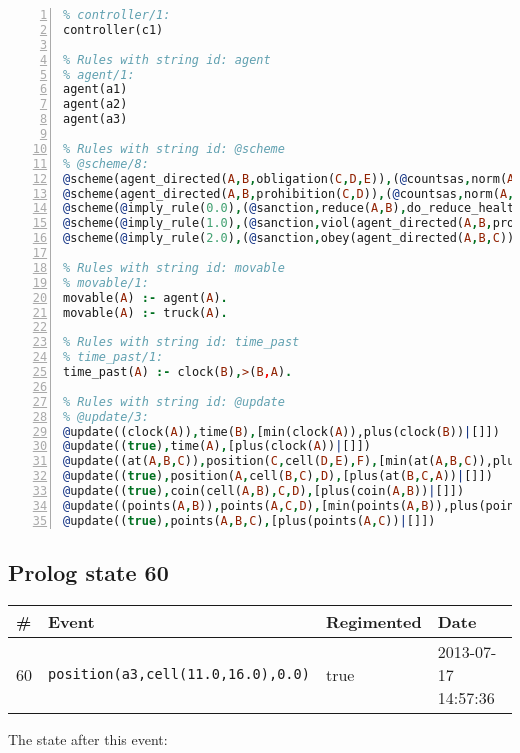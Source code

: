 \documentclass[11pt]{article}\usepackage[utf8]{inputenc}\usepackage{geometry}
\begin{document}
\begin{lstlisting}[language=Prolog, numbers=left]
% Rules with string id: controller
% controller/1:
controller(c1)

% Rules with string id: agent
% agent/1:
agent(a1)
agent(a2)
agent(a3)

% Rules with string id: @scheme
% @scheme/8:
@scheme(agent_directed(A,B,obligation(C,D,E)),(@countsas,norm(A,B,F,obligation(C,D,E)),F),false,(listTrue(C)),(time_past(D)),false,[plus(viol(agent_directed(A,B,obligation(C,D,E))))|[]],[plus(obey(agent_directed(A,B,obligation(C,D,E))))|[]])
@scheme(agent_directed(A,B,prohibition(C,D)),(@countsas,norm(A,B,E,prohibition(C,D)),E),(listTrue(C)),false,(false),false,[plus(viol(agent_directed(A,B,prohibition(C,D))))|[]],[plus(obey(agent_directed(A,B,prohibition(C,D))))|[]])
@scheme(@imply_rule(0.0),(@sanction,reduce(A,B),do_reduce_health(A,B),notifyAgent(A,changed(status))),true,false,false,false,[min(reduce(A,B))|[]],[])
@scheme(@imply_rule(1.0),(@sanction,viol(agent_directed(A,B,prohibition(C,D))),do_sanction(D)),true,false,false,false,[min(viol(agent_directed(A,B,prohibition(C,D))))|[]],[])
@scheme(@imply_rule(2.0),(@sanction,obey(agent_directed(A,B,C))),true,false,false,false,[min(obey(agent_directed(A,B,C)))|[]],[])

% Rules with string id: movable
% movable/1:
movable(A) :- agent(A).
movable(A) :- truck(A).

% Rules with string id: time_past
% time_past/1:
time_past(A) :- clock(B),>(B,A).

% Rules with string id: @update
% @update/3:
@update((clock(A)),time(B),[min(clock(A)),plus(clock(B))|[]])
@update((true),time(A),[plus(clock(A))|[]])
@update((at(A,B,C)),position(C,cell(D,E),F),[min(at(A,B,C)),plus(at(D,E,C))|[]])
@update((true),position(A,cell(B,C),D),[plus(at(B,C,A))|[]])
@update((true),coin(cell(A,B),C,D),[plus(coin(A,B))|[]])
@update((points(A,B)),points(A,C,D),[min(points(A,B)),plus(points(A,D))|[]])
@update((true),points(A,B,C),[plus(points(A,C))|[]])

\end{lstlisting}
\clearpage 
\subsection{Prolog state 60}
\begin{table}[ht]
\centering 
\begin{tabular}{l l l l} 
\textbf{\#} & \textbf{Event} & \textbf{Regimented} & \textbf{Date} \\ [0.5ex] 
\hline
60&\texttt{position(a3,cell(11.0,16.0),0.0)}&true&2013-07-17 14:57:36\\ [1ex] \hline\end{tabular}
\end{table}
The state after this event:
\end{document}
